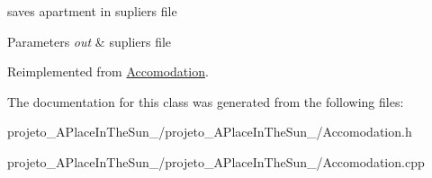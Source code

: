 saves apartment in supliers file 


\begin{DoxyParams}{Parameters}
{\em out} & supliers file \\
\hline
\end{DoxyParams}


Reimplemented from \hyperlink{class_accomodation_a4394eb907b2d5a23faf73dd03c1dac4d}{Accomodation}.



The documentation for this class was generated from the following files\+:\begin{DoxyCompactItemize}
\item 
projeto\+\_\+\+A\+Place\+In\+The\+Sun\+\_/projeto\+\_\+\+A\+Place\+In\+The\+Sun\+\_/Accomodation.\+h\item 
projeto\+\_\+\+A\+Place\+In\+The\+Sun\+\_/projeto\+\_\+\+A\+Place\+In\+The\+Sun\+\_/Accomodation.\+cpp\end{DoxyCompactItemize}
